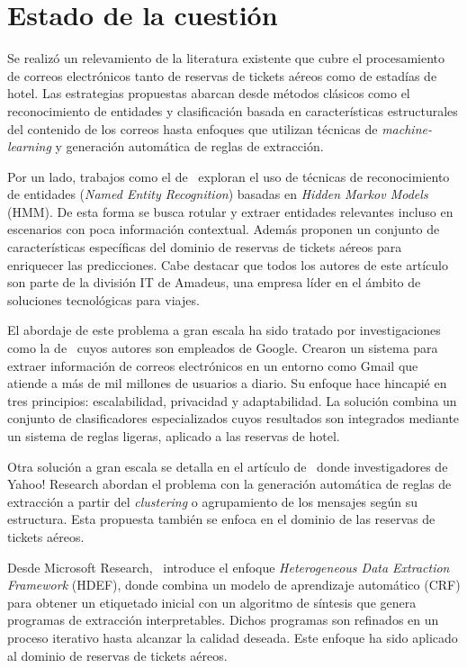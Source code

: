 \FloatBarrier{}
\section{Estado de la cuestión}%
\label{sec:state}

Se realizó un relevamiento de la literatura existente que cubre el procesamiento de correos electrónicos tanto de
reservas de tickets aéreos como de estadías de hotel.
Las estrategias propuestas abarcan desde métodos clásicos como el reconocimiento de entidades y clasificación basada en
características estructurales del contenido de los correos hasta enfoques que utilizan técnicas de
\textit{machine-learning} y generación automática de reglas de extracción.

Por un lado, trabajos como el de~\cite{Kaushik2017} exploran el uso de técnicas de reconocimiento de entidades
(\textit{Named Entity Recognition}) basadas en \textit{Hidden Markov Models} (HMM).
De esta forma se busca rotular y extraer entidades relevantes incluso en escenarios con poca información contextual.
Además proponen un conjunto de características específicas del dominio de reservas de tickets aéreos para enriquecer las
predicciones.
Cabe destacar que todos los autores de este artículo son parte de la división IT de Amadeus, una empresa líder en el
ámbito de soluciones tecnológicas para viajes.

El abordaje de este problema a gran escala ha sido tratado por investigaciones como la de~\cite{Sheng2018} cuyos autores
son empleados de Google.
Crearon un sistema para extraer información de correos electrónicos en un entorno como Gmail que atiende a más de mil
millones de usuarios a diario.
Su enfoque hace hincapié en tres principios: escalabilidad, privacidad y adaptabilidad.
La solución combina un conjunto de clasificadores especializados cuyos resultados son integrados mediante un sistema de
reglas ligeras, aplicado a las reservas de hotel.

Otra solución a gran escala se detalla en el artículo de~\cite{DiCastro2018} donde investigadores de Yahoo! Research
abordan el problema con la generación automática de reglas de extracción a partir del \textit{clustering} o agrupamiento
de los mensajes según su estructura.
Esta propuesta también se enfoca en el dominio de las reservas de tickets aéreos.

Desde Microsoft Research,~\cite{Iyer2019} introduce el enfoque \textit{Heterogeneous Data Extraction Framework} (HDEF),
donde combina un modelo de aprendizaje automático (CRF) para obtener un etiquetado inicial con un algoritmo de síntesis
que genera programas de extracción interpretables.
Dichos programas son refinados en un proceso iterativo hasta alcanzar la calidad deseada.
Este enfoque ha sido aplicado al dominio de reservas de tickets aéreos.


